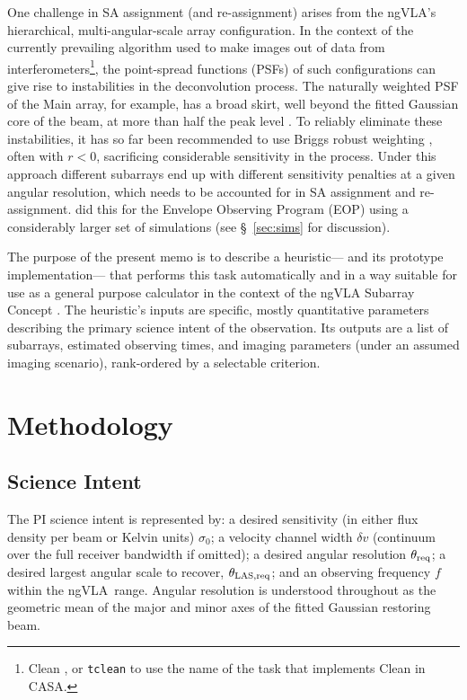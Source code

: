 \documentclass[11pt]{article}
\newcommand{\ngvla}{ngVLA}
\begin{document}
One challenge in SA assignment (and re-assignment) arises from the
\ngvla's hierarchical, multi-angular-scale array configuration.  In
the context of the currently prevailing algorithm used to make images
out of data from interferometers\footnote{Clean
\citep[e.g.][]{hogbom,clark, schwab}, or {\tt tclean} to use the name
of the task that implements Clean in CASA.}, the point-spread
functions (PSFs) of such configurations can give rise to instabilities
in the deconvolution process.  The naturally weighted PSF of the Main
array, for example, has a broad skirt, well beyond the fitted Gaussian
core of the beam, at more than half the peak level
\citep{memo65,memo121}.  To reliably eliminate these instabilities, it
has so far been recommended \citep{memo65,memo72,memo76,memo106} to
use Briggs robust weighting \citep{briggs}, often with $r < 0$,
sacrificing considerable sensitivity in the process.  Under this
approach different subarrays end up with different sensitivity
penalties at a given angular resolution, which needs to be accounted
for in SA assignment and re-assignment.  \citep{memo121} did this for
the Envelope Observing Program (EOP) using a considerably larger set
of simulations (see \S~\ref{sec:sims} for discussion).

The purpose of the present memo is to describe a heuristic--- and its
prototype implementation--- that performs this task automatically and
in a way suitable for use as a general purpose calculator in the
context of the ngVLA Subarray Concept \citep{saNarrative}. The heuristic's
inputs are specific, mostly quantitative parameters describing the
primary science intent of the observation. Its outputs are
a list of subarrays, estimated observing times, and imaging parameters (under
an assumed imaging scenario), rank-ordered by a selectable criterion.

\section{Methodology}
\label{sec:method}

\subsection{Science Intent}
\label{sec:scienceIntent}

The PI science intent is represented by: a desired sensitivity (in
either flux density per beam or Kelvin units) $\sigma_0$; a velocity
channel width $\delta v$ (continuum over the full receiver bandwidth
if omitted); a desired angular resolution $\theta_{\rm req}$; a
desired largest angular scale to recover, $\theta_{\rm LAS,req}$; and
an observing frequency $f$ within the \ngvla\ range.  Angular
resolution is understood throughout as the geometric mean of the
major and minor axes of the fitted Gaussian restoring beam.
\end{document}
